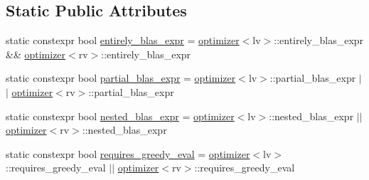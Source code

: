 \subsection*{Static Public Attributes}
\begin{DoxyCompactItemize}
\item 
static constexpr bool \hyperlink{structBC_1_1tensors_1_1exprs_1_1optimizer_3_01Binary__Expression_3_01op_00_01lv_00_01rv_01_4_00_f6303e0a787eb8566b71e5cc034a3dd8_a74858fc119f86f555e8e7732ee578251}{entirely\+\_\+blas\+\_\+expr} = \hyperlink{structBC_1_1tensors_1_1exprs_1_1optimizer}{optimizer}$<$lv$>$\+::entirely\+\_\+blas\+\_\+expr \&\& \hyperlink{structBC_1_1tensors_1_1exprs_1_1optimizer}{optimizer}$<$rv$>$\+::entirely\+\_\+blas\+\_\+expr
\item 
static constexpr bool \hyperlink{structBC_1_1tensors_1_1exprs_1_1optimizer_3_01Binary__Expression_3_01op_00_01lv_00_01rv_01_4_00_f6303e0a787eb8566b71e5cc034a3dd8_a8742d4d0e647e04979b930b428c7e338}{partial\+\_\+blas\+\_\+expr} = \hyperlink{structBC_1_1tensors_1_1exprs_1_1optimizer}{optimizer}$<$lv$>$\+::partial\+\_\+blas\+\_\+expr $\vert$$\vert$ \hyperlink{structBC_1_1tensors_1_1exprs_1_1optimizer}{optimizer}$<$rv$>$\+::partial\+\_\+blas\+\_\+expr
\item 
static constexpr bool \hyperlink{structBC_1_1tensors_1_1exprs_1_1optimizer_3_01Binary__Expression_3_01op_00_01lv_00_01rv_01_4_00_f6303e0a787eb8566b71e5cc034a3dd8_ac6c978c6ed3197cb7d95a19ac61209f0}{nested\+\_\+blas\+\_\+expr} = \hyperlink{structBC_1_1tensors_1_1exprs_1_1optimizer}{optimizer}$<$lv$>$\+::nested\+\_\+blas\+\_\+expr $\vert$$\vert$ \hyperlink{structBC_1_1tensors_1_1exprs_1_1optimizer}{optimizer}$<$rv$>$\+::nested\+\_\+blas\+\_\+expr
\item 
static constexpr bool \hyperlink{structBC_1_1tensors_1_1exprs_1_1optimizer_3_01Binary__Expression_3_01op_00_01lv_00_01rv_01_4_00_f6303e0a787eb8566b71e5cc034a3dd8_a703a9c20070646297f2820860d9a4e35}{requires\+\_\+greedy\+\_\+eval} = \hyperlink{structBC_1_1tensors_1_1exprs_1_1optimizer}{optimizer}$<$lv$>$\+::requires\+\_\+greedy\+\_\+eval $\vert$$\vert$ \hyperlink{structBC_1_1tensors_1_1exprs_1_1optimizer}{optimizer}$<$rv$>$\+::requires\+\_\+greedy\+\_\+eval
\end{DoxyCompactItemize}


